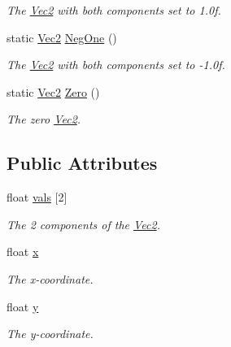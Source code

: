\begin{DoxyCompactItemize}
\begin{DoxyCompactList}\small\item\em The \hyperlink{classgofxmath_1_1_vec2}{Vec2} with both components set to 1.\+0f. \end{DoxyCompactList}\item 
\hypertarget{classgofxmath_1_1_vec2_af99c0a21b945e7cf075e2ee56aea2108}{}static \hyperlink{classgofxmath_1_1_vec2}{Vec2} \hyperlink{classgofxmath_1_1_vec2_af99c0a21b945e7cf075e2ee56aea2108}{Neg\+One} ()\label{classgofxmath_1_1_vec2_af99c0a21b945e7cf075e2ee56aea2108}

\begin{DoxyCompactList}\small\item\em The \hyperlink{classgofxmath_1_1_vec2}{Vec2} with both components set to -\/1.\+0f. \end{DoxyCompactList}\item 
\hypertarget{classgofxmath_1_1_vec2_a923f7a4f3c16d673e7eda2b7edfbe3c2}{}static \hyperlink{classgofxmath_1_1_vec2}{Vec2} \hyperlink{classgofxmath_1_1_vec2_a923f7a4f3c16d673e7eda2b7edfbe3c2}{Zero} ()\label{classgofxmath_1_1_vec2_a923f7a4f3c16d673e7eda2b7edfbe3c2}

\begin{DoxyCompactList}\small\item\em The zero \hyperlink{classgofxmath_1_1_vec2}{Vec2}. \end{DoxyCompactList}\end{DoxyCompactItemize}
\subsection*{Public Attributes}
\begin{DoxyCompactItemize}
\item 
float \hyperlink{classgofxmath_1_1_vec2_ab958b7bde2c40040f45d4fac9cd8217b}{vals} \mbox{[}2\mbox{]}
\begin{DoxyCompactList}\small\item\em The 2 components of the \hyperlink{classgofxmath_1_1_vec2}{Vec2}. \end{DoxyCompactList}\item 
float \hyperlink{classgofxmath_1_1_vec2_a09ebe2a3b8bdcfe220849bebb45a7e73}{x}
\begin{DoxyCompactList}\small\item\em The x-\/coordinate. \end{DoxyCompactList}\item 
float \hyperlink{classgofxmath_1_1_vec2_ac182a240fd0c4d554b970a1247d796d5}{y}
\begin{DoxyCompactList}\small\item\em The y-\/coordinate. \end{DoxyCompactList}\end{DoxyCompactItemize}
